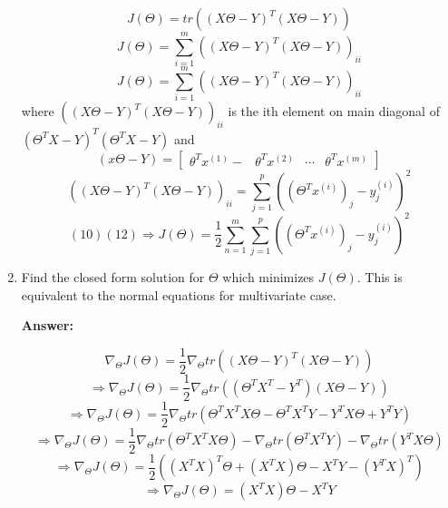 \documentclass[a4paper,14pt]{article}
\begin{document}
\begin{enumerate}[label=(\alph*)]
\begin{equation}
    J(\Theta) = tr\left( (X\Theta-Y)^{T}(X\Theta-Y) \right)
\end{equation}
\begin{equation}
    J(\Theta) = \sum_{i=1}^{m} \left( (X\Theta-Y)^{T}(X\Theta-Y) \right)_{ii}
\end{equation}
\begin{equation}
    J(\Theta) = \sum_{i=1}^{m} \left( (X\Theta-Y)^{T}(X\Theta-Y) \right)_{ii}
\end{equation}
where $\left( (X\Theta-Y)^{T}(X\Theta-Y) \right)_{ii}$ is the ith element on main diagonal of $(\Theta^{T}X-Y)^{T}(\Theta^{T}X-Y)$ and 
\begin{equation}
    (x\Theta-Y) = \begin{bmatrix}
    \theta^{T}x^{(1)}- & \theta^{T}x^{(2)} & \cdots & \theta^{T}x^{(m)}
    \end{bmatrix}
\end{equation}
\begin{equation}
    \left((X\Theta-Y)^{T}(X\Theta-Y) \right)_{ii} = \sum_{j=1}^{p} \left( \left( \Theta^{T}x^{(i)} \right)_{j} - y_{j}^{(i)} \right)^{2}
    \end{equation}
\begin{equation} 
    (10)(12)\Rightarrow  J(\Theta) = \frac{1}{2}\sum_{n=1}^{m}\sum_{j=1}^{p}\left( \left( \Theta^{T}x^{(i)} \right)_{j} - y_{j}^{(i)} \right)^{2}
\end{equation}


    \item Find the closed form solution for $\Theta$ which minimizes $J(\Theta)$. This is equivalent to the normal equations for multivariate case.

\textbf{Answer:}

\begin{equation}
    \nabla_{\Theta} J(\Theta) = \frac{1}{2}\nabla_{\Theta} tr\left( (X\Theta-Y)^{T}(X\Theta-Y) \right)
\end{equation}
\begin{equation}
    \Rightarrow \nabla_{\Theta} J(\Theta) = \frac{1}{2}\nabla_{\Theta} tr\left((\Theta^{T}X^{T}-Y^{T})(X\Theta-Y) \right)
\end{equation}
\begin{equation}
    \Rightarrow \nabla_{\Theta} J(\Theta) = \frac{1}{2}\nabla_{\Theta} tr(\Theta^{T}X^{T}X\Theta - \Theta^{T}X^{T}Y - Y^{T}X\Theta + Y^{T}Y)
\end{equation}
\begin{equation}
    \Rightarrow \nabla_{\Theta} J(\Theta) = \frac{1}{2}\nabla_{\Theta}tr(\Theta^{T}X^{T}X\Theta) - \nabla_{\Theta}tr(\Theta^{T}X^{T}Y) - \nabla_{\Theta}tr(Y^{T}X\Theta)
\end{equation}
\begin{equation}
    \Rightarrow \nabla_{\Theta} J(\Theta) = \frac{1}{2}\left((X^{T}X)^{T}\Theta+(X^{T}X)\Theta - X^{T}Y - (Y^{T}X)^{T} \right)
\end{equation}
\begin{equation}
    \Rightarrow \nabla_{\Theta} J(\Theta) = (X^{T}X)\Theta - X^{T}Y
\end{equation}


\end{enumerate}
\end{document}

